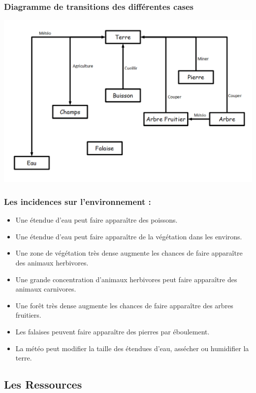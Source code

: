 \documentclass[a4paper]{article}
\begin{document}
        \subsubsection{Diagramme de transitions des différentes cases}
          \includegraphics[scale=0.35]{img/DiagrammeTransitionCases.png} 
          \label{DiagCase}
		  
        \subsubsection{Les incidences sur l'environnement :}
          \begin{itemize} \small
            \item Une étendue d'eau peut faire apparaître des poissons.
            \item Une étendue d'eau peut faire apparaître de la végétation dans les environs.
            \item Une zone de végétation très dense augmente les chances de faire apparaître des animaux herbivores.
            \item Une grande concentration d'animaux herbivores peut faire apparaître des animaux carnivores.
            \item Une forêt très dense augmente les chances de faire apparaître des arbres fruitiers.
            \item Les falaises peuvent faire apparaître des pierres par éboulement.
            \item La météo peut modifier la taille des étendues d'eau, assécher ou humidifier la terre.
          \end{itemize} \normalsize
        
        
      \subsection{Les Ressources}
	  
\end{document}
